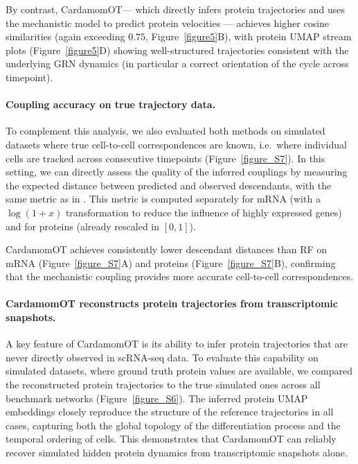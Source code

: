 \documentclass[a4paper, 11pt]{article}
\theoremstyle{plain}
\theoremstyle{remark}
\begin{document}
By contrast, CardamomOT— which directly infers protein trajectories
and uses the mechanistic model to predict protein velocities — achieves
higher cosine similarities (again exceeding $0.75$, Figure~\ref{figure5}B), with
protein UMAP stream plots (Figure~\ref{figure5}D) showing well-structured trajectories
consistent with the underlying GRN dynamics (in particular a correct orientation of the cycle across timepoint).

\paragraph{Coupling accuracy on true trajectory data.}

To complement this analysis, we also evaluated both methods on simulated datasets where
true cell-to-cell correspondences are known, i.e.\ where individual cells are tracked
across consecutive timepoints (Figure~\ref{figure_S7}). In this
setting, we can directly assess the quality of the inferred couplings by measuring the
expected distance between predicted and observed descendants, with the same metric as in \cite{forrow2021lineageot}. This metric is computed separately for mRNA (with a $\log(1+x)$ transformation to reduce the influence of highly expressed genes) and for proteins (already rescaled in $[0,1]$).

CardamomOT achieves consistently lower descendant distances than RF on mRNA (Figure~\ref{figure_S7}A) and proteins (Figure~\ref{figure_S7}B), confirming that the mechanistic coupling provides more accurate cell-to-cell correspondences. 

\paragraph{CardamomOT reconstructs protein trajectories from transcriptomic snapshots.}
A key feature of CardamomOT is its ability to infer protein trajectories that are 
never directly observed in scRNA-seq data. To evaluate this capability on simulated 
datasets, where ground truth protein values are available, we compared the 
reconstructed protein trajectories to the true simulated ones across all benchmark networks (Figure~\ref{figure_S6}). The inferred protein UMAP embeddings 
closely reproduce the structure of the reference trajectories in all cases, capturing 
both the global topology of the differentiation process and the temporal ordering of 
cells. This demonstrates that CardamomOT can reliably recover simulated hidden protein dynamics 
from transcriptomic snapshots alone.
\end{document}
